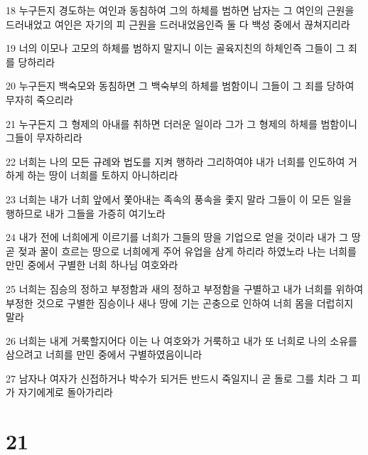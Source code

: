 \par 18 누구든지 경도하는 여인과 동침하여 그의 하체를 범하면 남자는 그 여인의 근원을 드러내었고 여인은 자기의 피 근원을 드러내었음인즉 둘 다 백성 중에서 끊쳐지리라
\par 19 너의 이모나 고모의 하체를 범하지 말지니 이는 골육지친의 하체인즉 그들이 그 죄를 당하리라
\par 20 누구든지 백숙모와 동침하면 그 백숙부의 하체를 범함이니 그들이 그 죄를 당하여 무자히 죽으리라
\par 21 누구든지 그 형제의 아내를 취하면 더러운 일이라 그가 그 형제의 하체를 범함이니 그들이 무자하리라
\par 22 너희는 나의 모든 규례와 법도를 지켜 행하라 그리하여야 내가 너희를 인도하여 거하게 하는 땅이 너희를 토하지 아니하리라
\par 23 너희는 내가 너희 앞에서 쫓아내는 족속의 풍속을 좇지 말라 그들이 이 모든 일을 행하므로 내가 그들을 가증히 여기노라
\par 24 내가 전에 너희에게 이르기를 너희가 그들의 땅을 기업으로 얻을 것이라 내가 그 땅 곧 젖과 꿀이 흐르는 땅으로 너희에게 주어 유업을 삼게 하리라 하였노라 나는 너희를 만민 중에서 구별한 너희 하나님 여호와라
\par 25 너희는 짐승의 정하고 부정함과 새의 정하고 부정함을 구별하고 내가 너희를 위하여 부정한 것으로 구별한 짐승이나 새나 땅에 기는 곤충으로 인하여 너희 몸을 더럽히지 말라
\par 26 너희는 내게 거룩할지어다 이는 나 여호와가 거룩하고 내가 또 너희로 나의 소유를 삼으려고 너희를 만민 중에서 구별하였음이니라
\par 27 남자나 여자가 신접하거나 박수가 되거든 반드시 죽일지니 곧 돌로 그를 치라 그 피가 자기에게로 돌아가리라

\chapter{21}

